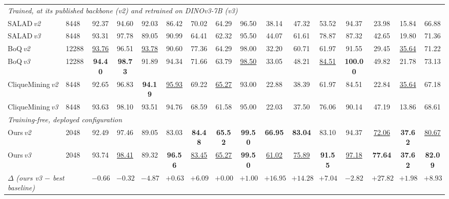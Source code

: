 \begin{table}[t]
{{\begin{tabular}{llccccccccccccc|c}
\midrule
\multicolumn{16}{l}{\emph{Trained, at its published backbone (\emph{v2}) and retrained on DINOv3-7B (\emph{v3})}} \\
SALAD\,\emph{v2} & 8448 & 92.37 & 94.60 & 92.03 & 86.42 & 70.02 & 64.29 & 96.50 & 38.14 & 47.32 & 53.52 & 94.37 & 23.98 & 15.84 & 66.88 \\
SALAD\,\emph{v3} & 8448 & 93.31 & 97.78 & 89.05 & 90.99 & 64.41 & 62.32 & 95.50 & 44.07 & 61.61 & 78.87 & 87.32 & 42.65 & 19.80 & 71.36 \\
BoQ\,\emph{v2} & 12288 & \underline{93.76} & 96.51 & \underline{93.78} & 90.60 & 77.36 & 64.29 & 98.00 & 32.20 & 60.71 & 61.97 & 91.55 & 29.45 & \underline{35.64} & 71.22 \\
BoQ\,\emph{v3} & 12288 & \textbf{94.40} & \textbf{98.73} & 91.89 & 94.34 & 71.66 & 63.79 & \underline{98.50} & 33.05 & 48.21 & \underline{84.51} & \textbf{100.00} & 49.82 & 21.78 & 73.13 \\
CliqueMining\,\emph{v2} & 8448 & 92.65 & 96.83 & \textbf{94.19} & \underline{95.93} & 69.22 & \underline{65.27} & 93.00 & 22.88 & 38.39 & 61.97 & 84.51 & 22.84 & \underline{35.64} & 67.18 \\
CliqueMining\,\emph{v3} & 8448 & 93.63 & 98.10 & 93.51 & 94.76 & 68.59 & 61.58 & 95.00 & 22.03 & 37.50 & 76.06 & 90.14 & 47.19 & 13.86 & 68.61 \\
\midrule
\multicolumn{16}{l}{\emph{Training-free, deployed configuration}} \\
Ours\,\emph{v2} & 2048 & 92.49 & 97.46 & 89.05 & 83.03 & \textbf{84.48} & \textbf{65.52} & \textbf{99.50} & \textbf{66.95} & \textbf{83.04} & 83.10 & 94.37 & \underline{72.06} & \textbf{37.62} & \underline{80.67} \\
Ours\,\emph{v3} & 2048 & 93.74 & \underline{98.41} & 89.32 & \textbf{96.56} & \underline{83.45} & \underline{65.27} & \textbf{99.50} & \underline{61.02} & \underline{75.89} & \textbf{91.55} & \underline{97.18} & \textbf{77.64} & \textbf{37.62} & \textbf{82.09} \\
\midrule
\multicolumn{2}{l}{$\Delta$ \emph{(ours v3 $-$ best baseline)}} & $-0.66$ & $-0.32$ & $-4.87$ & $+0.63$ & $+6.09$ & $+0.00$ & $+1.00$ & $+16.95$ & $+14.28$ & $+7.04$ & $-2.82$ & $+27.82$ & $+1.98$ & $+8.93$ \\
\bottomrule
\end{tabular}%
}%
}
\end{table}

